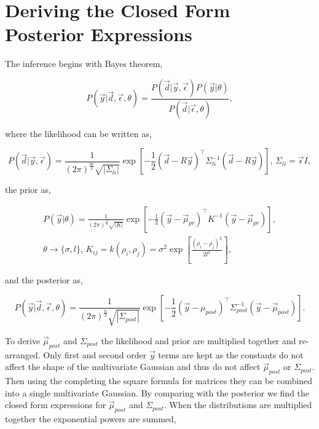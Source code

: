 \chapter{Deriving the Closed Form Posterior Expressions}
\label{append:dervcf}
The inference begins with Bayes theorem,  

\begin{equation}    
    P(\vec{y}|\vec{d}, \vec\epsilon, \theta) = \frac{P(\vec{d}|\vec{y},\vec\epsilon)P(\vec{y}|\theta)}{P(\vec d|\vec\epsilon,\theta)},
\end{equation}

\noindent where the likelihood can be written as,

\begin{equation}
P(\vec{d}|\vec{y},\vec\epsilon) = \frac{1}{(2\pi)^{\frac{m}{2}} \sqrt{|\Sigma_{li}|}} \exp \left[ -\frac{1}{2} (\vec d - R\vec y)^{\top} \Sigma^{-1}_{li} (\vec d - R\vec y) \right], \, \Sigma_{li} = \vec \epsilon I,
\end{equation}

\noindent the prior as,

\begin{equation}
\begin{split}
P(\vec y|\theta) = \frac{1}{(2\pi)^{\frac{n}{2}} \sqrt{|K|}} \exp \left[ -\frac{1}{2}(\vec y - \vec \mu_{pr})^{\top} K^{-1} (\vec y - \vec \mu_{pr}) \right],\\
\theta \rightarrow \{\sigma, l\}, \, K_{ij} = k(\rho_i, \rho_j) = \sigma^2 \exp \left[\frac{(\rho_i - \rho_j)^2}{2l^2}\right],
\end{split}
\end{equation}

\noindent and the posterior as,

\begin{equation}
P(\vec{y}|\vec{d},\vec\epsilon, \theta) = \frac{1}{(2\pi)^{\frac{n}{2}} \sqrt{|\Sigma_{post}|}} \exp \left[ -\frac{1}{2}(\vec y - \mu_{post})^{\top} \Sigma^{-1}_{post} (\vec y - \vec{\mu}_{post}) \right].
\end{equation}

\noindent To derive $\vec{\mu}_{post}$ and $\Sigma_{post}$ the likelihood and prior are multiplied together and re-arranged. Only first and second order $\vec y$ terms are kept as the constants do not affect the shape of the multivariate Gaussian and thus do not affect $\vec{\mu}_{post}$ or $\Sigma_{post}$. Then using the completing the square formula for matrices they can be combined into a single multivariate Gaussian. By comparing with the posterior we find the closed form expressions for $\vec{\mu}_{post}$ and $\Sigma_{post}$. When the distributions are multiplied together the exponential powers are summed,

